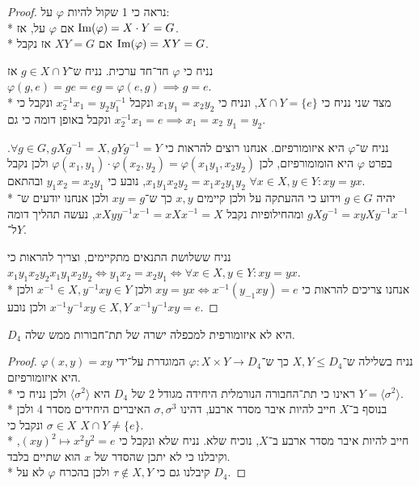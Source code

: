 \begin{proof}
	נראה כי 1 שקול להיות $\varphi$ על: \\*
	אם $\varphi$ על, אז $\operatorname{Im}(\varphi) = X \cdot Y = G$. \\*
	אם $XY = G$ אז נקבל $\operatorname{Im}(\varphi) = XY = G$.

	נניח כי $\varphi$ חד־חד ערכית.
	נניח ש־$g \in X \cap Y$ אז $\varphi(g, e) = ge = eg = \varphi(e, g) \implies g = e$. \\*
	מצד שני נניח כי $X \cap Y = \{e\}$, ונניח כי $x_1 y_1 = x_2 y_2$ ונקבל $x_2^{-1} x_1 = y_2 y_1^{-1}$ ונקבל כי $x_2^{-1} x_1 = e \implies x_1 = x_2$ ונקבל באופן דומה כי גם $y_1 = y_2$.

	נניח ש־$\varphi$ היא איזומורפיזם.
	אנחנו רוצים להראות כי $\forall g \in G, gXg^{-1} = X, g Y g^{-1} = Y$.
	בפרט $\varphi$ היא הומומורפיזם, לכן $\varphi(x_1, y_1) \cdot \varphi(x_2, y_2) = \varphi(x_1 y_1, x_2 y_2)$ ולכן נקבל $x_1 y_1 x_2 y_2 = x_1 x_2 y_1 y_2$,
	נובע כי $y_1 x_2 = x_2 y_1$ ובהתאם $\forall x \in X, y \in Y : xy = yx$. \\*
	יהיה $g \in G$ וידוע כי ההעתקה על ולכן קיימים $x, y$ כך ש־$xy = g$ ולכן אנחנו יודעים ש־$g X g^{-1} = xy X y^{-1} x^{-1}$ ומהחילופיות נקבל $x X y y^{-1} x^{-1} = x X x^{-1} = X$, נעשה תהליך דומה ל־$Y$.

	נניח ששלושת התנאים מתקיימים, וצריך להראות כי $x_1 y_1 x_2 y_2 x_1 y_1 x_2 y_2 \iff y_1 x_2 = x_2 y_1 \iff \forall x \in X, y \in Y : xy = yx$. \\*
	אנחנו צריכים להראות כי $xy = yx \iff x^{-1} (y_{-1} x y) = e$ ולכן $x^{-1} \in X, y^{-1} x y \in Y$ ולכן $x^{-1} y^{-1} x y \in X, Y$ ולכן נובע $x^{-1} y^{-1} x y = e$.
\end{proof}
\begin{proposition}
	$D_4$ היא לא איזומורפית למכפלה ישרה של תת־חבורות ממש שלה.
\end{proposition}
\begin{proof}
	נניח בשלילה ש־$X, Y \le D_4$ כך ש־$\varphi : X \times Y \to D_4$ המוגדרת על־ידי $\varphi(x, y) = xy$ היא איזומורפיזם. \\*
	ראינו כי תת־החבורה הנורמלית היחידה מגודל $2$ של $D_4$ היא $\langle \sigma^2 \rangle$ ולכן נניח כי $Y = \langle \sigma^2 \rangle$. \\*
	בנוסף ב־$X$ חייב להיות איבר מסדר ארבע, דהינו $\sigma, \sigma^3$ האיברים היחידים מסדר 4 ולכן $\sigma \in X$ ונקבל כי $X \cap Y \ne \{ e \}$. \\*
	חייב להיות איבר מסדר ארבע ב־$X$, נוכיח שלא.
	נניח שלא ונקבל כי ${(xy)}^2 \mapsto x^2 y^2 = e$, וקיבלנו כי לא יתכן שהסדר של $x$ הוא שתיים בלבד. \\*
	קיבלנו גם כי $\tau \notin X, Y$ ולכן בהכרח $\varphi$ לא על $D_4$.
\end{proof}
